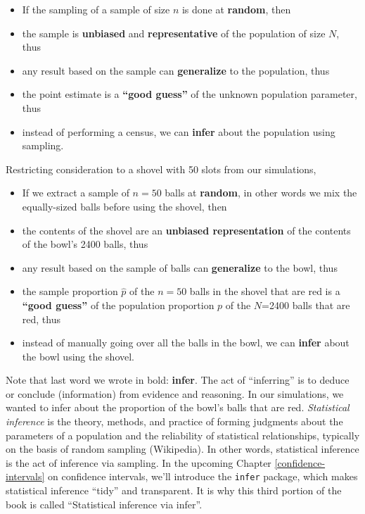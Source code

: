 \documentclass[12pt, krantz2,]{krantz}
\providecommand{\tightlist}{%
  \setlength{\itemsep}{0pt}\setlength{\parskip}{0pt}}
\renewenvironment{quote}{\begin{VF}}{\end{VF}}
\begin{document}
\begin{quote}
\begin{itemize}
\tightlist
\item
  If the sampling of a sample of size \(n\) is done at \textbf{random}, then
\item
  the sample is \textbf{unbiased} and \textbf{representative} of the population of size \(N\), thus
\item
  any result based on the sample can \textbf{generalize} to the population, thus
\item
  the point estimate is a \textbf{``good guess''} of the unknown population parameter, thus
\item
  instead of performing a census, we can \textbf{infer} about the population using sampling.
\end{itemize}
\end{quote}

Restricting consideration to a shovel with 50 slots from our simulations,

\begin{quote}
\begin{itemize}
\tightlist
\item
  If we extract a sample of \(n=50\) balls at \textbf{random}, in other words we mix the equally-sized balls before using the shovel, then
\item
  the contents of the shovel are an \textbf{unbiased representation} of the contents of the bowl's 2400 balls, thus
\item
  any result based on the sample of balls can \textbf{generalize} to the bowl, thus
\item
  the sample proportion \(\widehat{p}\) of the \(n=50\) balls in the shovel that are red is a \textbf{``good guess''} of the population proportion \(p\) of the \(N\)=2400 balls that are red, thus
\item
  instead of manually going over all the balls in the bowl, we can \textbf{infer} about the bowl using the shovel.
\end{itemize}
\end{quote}

Note that last word we wrote in bold: \textbf{infer}. The act of ``inferring'' is to deduce or conclude (information) from evidence and reasoning. In our simulations, we wanted to infer about the proportion of the bowl's balls that are red. \emph{Statistical inference} is the theory, methods, and practice of forming judgments about the parameters of a population and the reliability of statistical relationships, typically on the basis of random sampling (Wikipedia). In other words, statistical inference is the act of inference via sampling. In the upcoming Chapter \ref{confidence-intervals} on confidence intervals, we'll introduce the \texttt{infer} package, which makes statistical inference ``tidy'' and transparent. It is why this third portion of the book is called ``Statistical inference via infer''.
\end{document}
